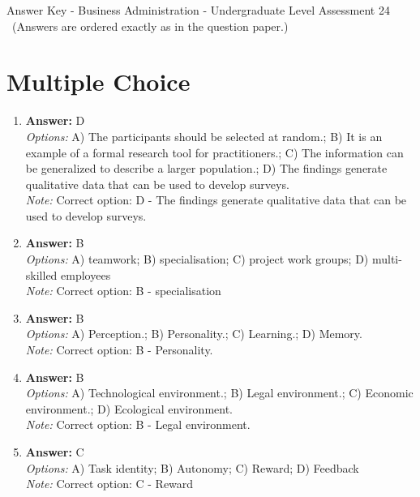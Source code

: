 \documentclass[12pt]{article}
\begin{document}
\begin{center}
Answer Key - Business Administration - Undergraduate Level Assessment 24 \
\small (Answers are ordered exactly as in the question paper.)
\end{center}

\section*{Multiple Choice}
\begin{enumerate}[label=\arabic*.]
\item \textbf{Answer:} D
\\ \textit{Options:} A) The participants should be selected at random.; B) It is an example of a formal research tool for practitioners.; C) The information can be generalized to describe a larger population.; D) The findings generate qualitative data that can be used to develop surveys.
\\ \textit{Note:} Correct option: D - The findings generate qualitative data that can be used to develop surveys.
\item \textbf{Answer:} B
\\ \textit{Options:} A) teamwork; B) specialisation; C) project work groups; D) multi-skilled employees
\\ \textit{Note:} Correct option: B - specialisation
\item \textbf{Answer:} B
\\ \textit{Options:} A) Perception.; B) Personality.; C) Learning.; D) Memory.
\\ \textit{Note:} Correct option: B - Personality.
\item \textbf{Answer:} B
\\ \textit{Options:} A) Technological environment.; B) Legal environment.; C) Economic environment.; D) Ecological environment.
\\ \textit{Note:} Correct option: B - Legal environment.
\item \textbf{Answer:} C
\\ \textit{Options:} A) Task identity; B) Autonomy; C) Reward; D) Feedback
\\ \textit{Note:} Correct option: C - Reward
\end{enumerate}
\end{document}
